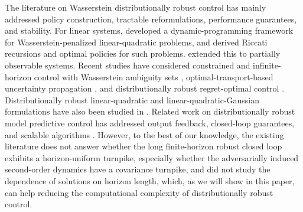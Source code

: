 \documentclass[10pt,journal,twoside]{IEEEtran}
\theoremstyle{definition}
\theoremstyle{remark}
\begin{document}
The literature on Wasserstein distributionally robust control has mainly addressed policy construction, tractable reformulations, performance guarantees, and stability. For linear systems, \cite{Yang2021TAC} developed a dynamic-programming framework for Wasserstein-penalized linear-quadratic problems, and \cite{KimYang2020,KimYang2023} derived Riccati recursions and optimal policies for such problems. \cite{HakobyanYang2024} extended this to partially observable systems. Recent studies have considered constrained and infinite-horizon control with Wasserstein ambiguity sets
\cite{BrouillonMartinLygerosDorflerFerrariTrecate2025}, optimal-transport-based uncertainty propagation
\cite{AolariteiLanzettiChenDorfler2025}, and distributionally robust regret-optimal control \cite{KarginHajarMalikHassibi2024}.
Distributionally robust linear-quadratic and linear-quadratic-Gaussian formulations have also been studied in \cite{TaskesenIancuKocyigitKuhn2023,
SchobiLanzettiDorflerDAndreaTerpin2026}. Related work on distributionally robust model predictive control has addressed output feedback, closed-loop guarantees, and scalable algorithms
\cite{LiGuanDaiDuan2024,McAllisterEsfahani2025}.
However, to the best of our knowledge, the existing literature does not answer whether the long finite-horizon robust closed loop exhibits a horizon-uniform turnpike, especially whether the adversarially induced second-order dynamics have a covariance turnpike, and did not study the dependence of solutions on horizon length, which, as we will show in this paper, can help reducing the computational complexity of distributionally robust control.
\end{document}
